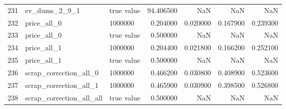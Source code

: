 \begin{tabular}{lllrrrr}
231 & ev_dums_2_9_1 & true value & 94.406500 & NaN & NaN & NaN \\
232 & price_all_0 & 1000000 & 0.204000 & 0.020000 & 0.167900 & 0.239300 \\
233 & price_all_0 & true value & 0.500000 & NaN & NaN & NaN \\
234 & price_all_1 & 1000000 & 0.204400 & 0.021800 & 0.166200 & 0.252100 \\
235 & price_all_1 & true value & 0.500000 & NaN & NaN & NaN \\
236 & scrap_correction_all_0 & 1000000 & 0.466200 & 0.030800 & 0.408900 & 0.523600 \\
237 & scrap_correction_all_1 & 1000000 & 0.465900 & 0.030900 & 0.398500 & 0.526800 \\
238 & scrap_correction_all_all & true value & 0.500000 & NaN & NaN & NaN \\
\bottomrule
\end{tabular}
